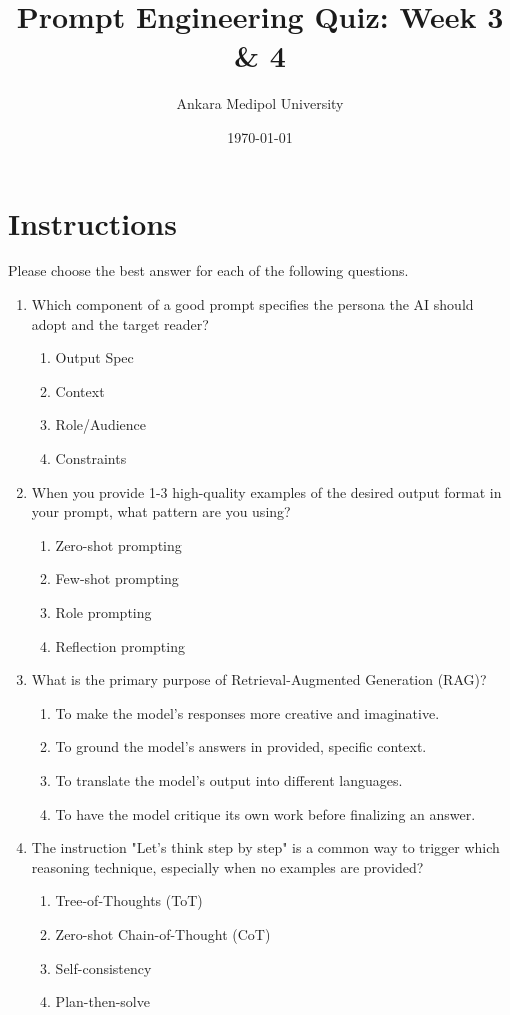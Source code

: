 \documentclass{article}
\title{Prompt Engineering Quiz: Week 3 \& 4}
\author{Ankara Medipol University}
\date{\today}
\begin{document}
\maketitle

\section*{Instructions}
Please choose the best answer for each of the following questions.

\begin{enumerate}

    \item Which component of a good prompt specifies the persona the AI should adopt and the target reader?
    \begin{enumerate}
        \item Output Spec
        \item Context
        \item Role/Audience
        \item Constraints
    \end{enumerate}

    \item When you provide 1-3 high-quality examples of the desired output format in your prompt, what pattern are you using?
    \begin{enumerate}
        \item Zero-shot prompting
        \item Few-shot prompting
        \item Role prompting
        \item Reflection prompting
    \end{enumerate}

    \item What is the primary purpose of Retrieval-Augmented Generation (RAG)?
    \begin{enumerate}
        \item To make the model's responses more creative and imaginative.
        \item To ground the model's answers in provided, specific context.
        \item To translate the model's output into different languages.
        \item To have the model critique its own work before finalizing an answer.
    \end{enumerate}

    \item The instruction "Let's think step by step" is a common way to trigger which reasoning technique, especially when no examples are provided?
    \begin{enumerate}
        \item Tree-of-Thoughts (ToT)
        \item Zero-shot Chain-of-Thought (CoT)
        \item Self-consistency
        \item Plan-then-solve
    \end{enumerate}


\end{enumerate}
\end{document}

